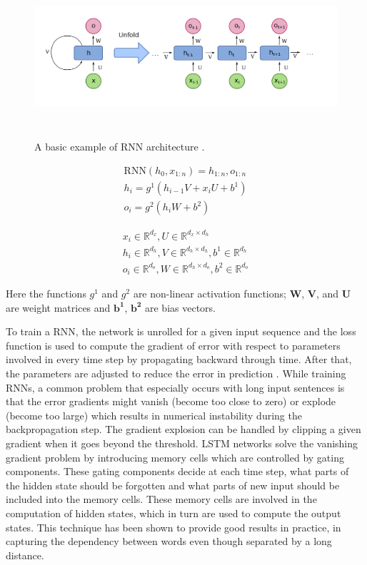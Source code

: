 \documentclass[a4paper, 11pt]{article}
\begin{document}
\begin{figure}[htpb!]
    \centering
    \includegraphics[width=\textwidth,height=6cm,keepaspectratio=true]
    {Recurrent_neural_network_unfold.png}
    \caption{
        A basic example of RNN architecture \parencite{WikipediaEN_RNN_unfold}.
    }
    \label{fig:A basic RNN architecture}
\end{figure}

\begin{align*}
\mathrm{RNN}(h_0,x_{1:n}) = h_{1:n}, o_{1:n} \\
h_i = g^1(h_{i-1}V + x_iU + b^1) \\
o_i = g^2(h_iW + b^2) 
\end{align*}

\begin{align*}
x_i \in \mathbb{R}^{d_x}, U \in \mathbb{R}^{d_x \times d_h} \\
h_i \in \mathbb{R}^{d_h}, V \in \mathbb{R}^{d_h \times d_h}, b^1 \in \mathbb{R}^{d_h} \\
o_i \in \mathbb{R}^{d_o}, W \in \mathbb{R}^{d_h \times d_o}, b^2 \in \mathbb{R}^{d_o}
\end{align*}

Here the functions $g^{1}$ and $g^{2}$ are non-linear activation functions; $\mathbf{W}$, $\mathbf{V}$, and $\mathbf{U}$ are weight matrices and $\mathbf{b^{1}}$, $\mathbf{b^{2}}$ are bias vectors. 

To train a RNN, the network is unrolled for a given input sequence and the loss function is used to compute the gradient of error with respect to parameters involved in every time step by propagating backward through time. After that, the parameters are adjusted to reduce the error in prediction \parencite{Werbos1990}. While training RNNs, a common problem that especially occurs with long input sentences is that the error gradients might vanish (become too close to zero) or explode (become too large) which results in numerical instability during the backpropagation step. The gradient explosion can be handled by clipping a given gradient when it goes beyond the threshold. LSTM networks \parencite{Hochreiter1997} solve the vanishing gradient problem by introducing memory cells which are controlled by gating components. These gating components decide at each time step, what parts of the hidden state should be forgotten and what parts of new input should be included into the memory cells. These memory cells are involved in the computation of hidden states, which in turn are used to compute the output states. This technique has been shown to provide good results in practice, in capturing the dependency between words even though separated by a long distance.
\end{document}
